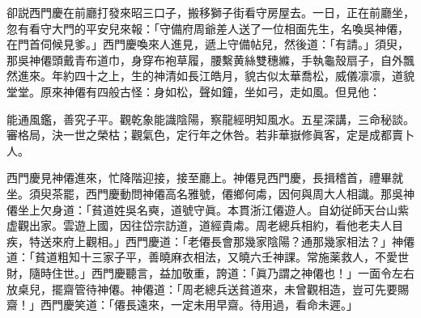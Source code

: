 卻説西門慶在前廳打發來昭三口子，搬移獅子街看守房屋去。一日，正在前廳坐，忽有看守大門的平安兒來報：「守備府周爺差人送了一位相面先生，名喚吳神僊，在門首伺候見爹。」西門慶喚來人進見，遞上守備帖兒，然後道：「有請。」須臾，那吳神僊頭戴青布道巾，身穿布袍草履，腰繫黄絲雙穗縧，手執龜殼扇子，自外飄然進來。年約四十之上，生的神清如長江皓月，貌古似太華喬松，威儀凛凛，道貌堂堂。原來神僊有四般古怪：身如松，聲如鐘，坐如弓，走如風。但見他：

\begin{myquote}
能通風鑑，善究子平。觀乾象能識陰陽，察龍經明知風水。五星深講，三命秘談。審格局，決一世之榮枯；觀氣色，定行年之休咎。若非華嶽修眞客，定是成都賣卜人。
\end{myquote}

西門慶見神僊進來，忙降階迎接，接至廳上。神僊見西門慶，長揖稽首，禮畢就坐。須臾茶罷，西門慶動問神僊高名雅號，僊鄉何䖏，因何與周大人相識。那吳神僊坐上欠身道：「貧道姓吳名奭，道號守眞。本貫浙江僊遊人。自幼従師天台山紫虚觀出家。雲遊上國，因往岱宗訪道，道經貴䖏。周老總兵相約，看他老夫人目疾，特送來府上觀相。」西門慶道：「老僊長會那幾家陰陽？通那幾家相法？」神僊道：「貧道粗知十三家子平，善曉麻衣相法，又曉六壬神課。常施薬救人，不愛世財，隨時住世。」西門慶聽言，益加敬重，誇道：「眞乃謂之神僊也！」一面令左右放桌兒，擺齋管待神僊。神僊道：「周老總兵送貧道來，未曾觀相造，豈可先要賜齋！」西門慶笑道：「僊長遠來，一定未用早齋。待用過，看命未遲。」

